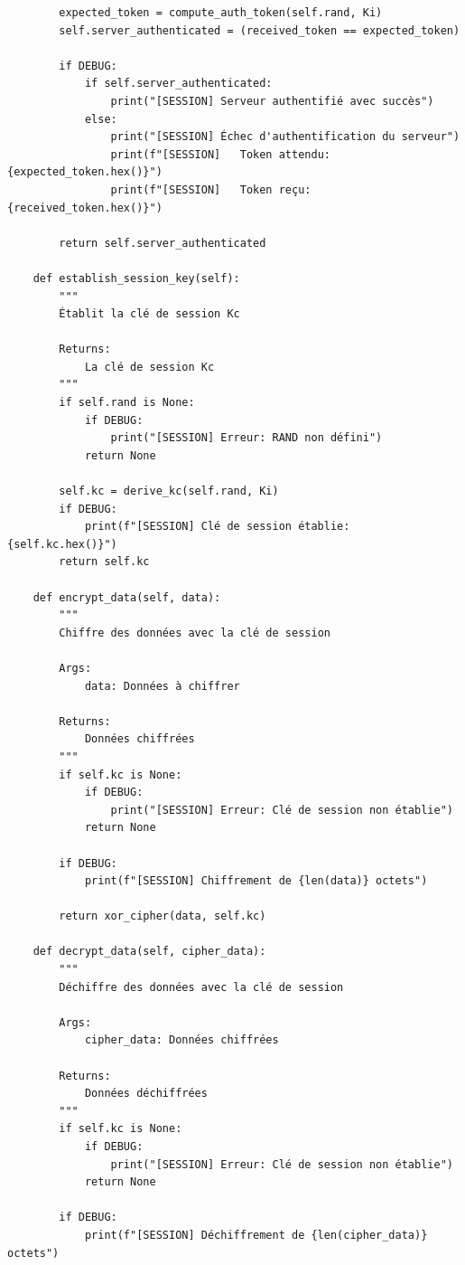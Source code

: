 \documentclass[12pt,a4paper]{report}
\begin{document}
\begin{verbatim}
        expected_token = compute_auth_token(self.rand, Ki)
        self.server_authenticated = (received_token == expected_token)
        
        if DEBUG:
            if self.server_authenticated:
                print("[SESSION] Serveur authentifié avec succès")
            else:
                print("[SESSION] Échec d'authentification du serveur")
                print(f"[SESSION]   Token attendu: {expected_token.hex()}")
                print(f"[SESSION]   Token reçu: {received_token.hex()}")
        
        return self.server_authenticated
    
    def establish_session_key(self):
        """
        Établit la clé de session Kc
        
        Returns:
            La clé de session Kc
        """
        if self.rand is None:
            if DEBUG:
                print("[SESSION] Erreur: RAND non défini")
            return None
        
        self.kc = derive_kc(self.rand, Ki)
        if DEBUG:
            print(f"[SESSION] Clé de session établie: {self.kc.hex()}")
        return self.kc
    
    def encrypt_data(self, data):
        """
        Chiffre des données avec la clé de session
        
        Args:
            data: Données à chiffrer
        
        Returns:
            Données chiffrées
        """
        if self.kc is None:
            if DEBUG:
                print("[SESSION] Erreur: Clé de session non établie")
            return None
        
        if DEBUG:
            print(f"[SESSION] Chiffrement de {len(data)} octets")
        
        return xor_cipher(data, self.kc)
    
    def decrypt_data(self, cipher_data):
        """
        Déchiffre des données avec la clé de session
        
        Args:
            cipher_data: Données chiffrées
        
        Returns:
            Données déchiffrées
        """
        if self.kc is None:
            if DEBUG:
                print("[SESSION] Erreur: Clé de session non établie")
            return None
        
        if DEBUG:
            print(f"[SESSION] Déchiffrement de {len(cipher_data)} octets")
        

\end{verbatim}
\end{document}
